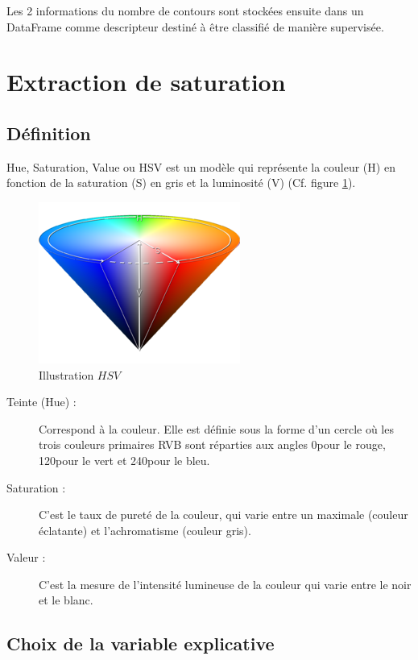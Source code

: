 \documentclass{book}
\begin{document}
Les 2 informations du nombre de contours sont stockées ensuite dans un DataFrame comme descripteur
destiné à être classifié de manière supervisée.

\section{Extraction de saturation}
\subsection{Définition}
Hue, Saturation, Value ou HSV est un modèle qui représente la couleur (H) en fonction de la saturation (S) en gris et la luminosité (V) (Cf. figure \ref{HSV}).
\begin{figure}[H]
\begin{center}
\includegraphics[scale=0.5]{hue.jpg}
\end{center}
\caption{Illustration $HSV$ \cite{wiki:hsv}}
\label{HSV}
\end{figure}
\begin{description}
\item[Teinte (Hue) :] Correspond à la couleur. Elle est définie sous la forme
d'un cercle où les trois couleurs primaires RVB sont
réparties aux angles 0\degre pour le rouge, 120\degre pour le vert
et 240\degre pour le bleu.
\item[Saturation :] C’est le taux de pureté de la couleur, qui varie entre un
maximale (couleur éclatante) et l’achromatisme (couleur
gris).
\item[Valeur :]  C’est la mesure de l’intensité lumineuse de la couleur
qui varie entre le noir et le blanc.
\end{description}

\subsection{Choix de la variable explicative}
\end{document}

